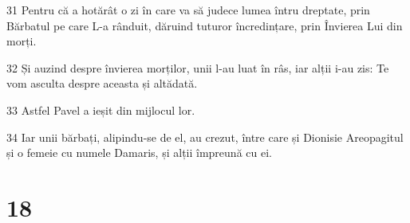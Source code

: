 \par 31 Pentru că a hotărât o zi în care va să judece lumea întru dreptate, prin Bărbatul pe care L-a rânduit, dăruind tuturor încredințare, prin Învierea Lui din morți.
\par 32 Și auzind despre învierea morților, unii l-au luat în râs, iar alții i-au zis: Te vom asculta despre aceasta și altădată.
\par 33 Astfel Pavel a ieșit din mijlocul lor.
\par 34 Iar unii bărbați, alipindu-se de el, au crezut, între care și Dionisie Areopagitul și o femeie cu numele Damaris, și alții împreună cu ei.

\chapter{18}

